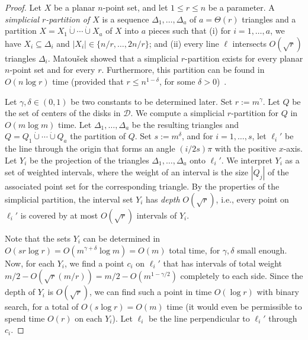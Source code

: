 \documentclass{paper}
\newcommand {\eqdef}{:=}
\newcommand {\script} [1] {\ensuremath {\mathcal {#1}}}
\newcommand {\D} {\script {D}}
\begin{document}
\begin{proof}
Let $X$ be a planar $n$-point set, and let $1 \leq r \leq n$ be a parameter.
A \emph{simplicial $r$-partition of $X$} is 
a sequence $\Delta_1, \dots, \Delta_a$ of 
$a = \Theta(r)$ triangles and a partition $X = X_1 \dot\cup \cdots \dot\cup X_a$ of $X$ 
into $a$ pieces such
that  (i) for $i = 1, \dots, a$, we have $X_i \subseteq \Delta_i$
and $|X_i| \in \{n/r, \dots, 2n/r\}$; and (ii) every line $\ell$ intersects 
$O(\sqrt{r})$ triangles $\Delta_i$.
Matou\v{s}ek showed that a simplicial $r$-partition exists for every 
planar $n$-point set and for every $r$. 
Furthermore, this partition can be found in
$O(n \log r)$ time (provided that $r \leq n^{1-\delta}$, for 
some $\delta > 0$)~\cite[Theorem~4.7]{Matousek92}.

Let $\gamma, \delta \in (0,1)$ be two constants to be determined later. Set 
$r \eqdef m^{\gamma}$. Let $Q$ be the set of centers of the disks in $\D$.
We compute a simplicial $r$-partition for $Q$ in $O(m \log m)$ time. 
Let $\Delta_1, \dots, \Delta_a$ be the resulting triangles and
$Q = Q_1 \dot\cup \cdots \dot\cup Q_a$ the partition of $Q$.
Set $s \eqdef m^{\delta}$, and for $i = 1, \dots, s$, let $\ell_i'$
be the line through the origin that  forms an angle $(i/2s)\pi$ with the 
positive $x$-axis.
Let $Y_i$ be the projection of the triangles
$\Delta_1, \dots, \Delta_a$ onto $\ell_i'$.
We interpret $Y_i$ as a set
of weighted intervals, where the weight of an interval is the size $|Q_j|$ of 
the associated point set for the corresponding triangle.
By the properties of the simplicial partition, the interval set $Y_i$ 
has \emph{depth} $O(\sqrt{r})$,
i.e., every point on $\ell_i'$ is covered by at most $O(\sqrt{r})$ intervals 
of $Y_i$.

Note that the sets $Y_i$ can be determined in $O(s r \log r) = 
O(m^{\gamma+\delta} \log m) = O(m)$ total time, for $\gamma, \delta$ small enough.
Now, for each  $Y_i$, we find a point $c_i$ on $\ell_i'$ that has intervals of
total weight $m/2 - O(\sqrt{r}(m/r)) = m/2 - O(m^{1-\gamma/2})$  completely to 
each side. Since the depth of
$Y_i$ is $O(\sqrt{r})$, we can find such a point in time $O(\log r)$ with
binary search, for a total of $O(s \log r) = O(m)$ time (it would even be
permissible to spend time $O(r)$ on each $Y_i$). Let $\ell_i$ be the line
perpendicular to $\ell_{i}'$ through $c_i$.


\end{proof}
\end{document}
